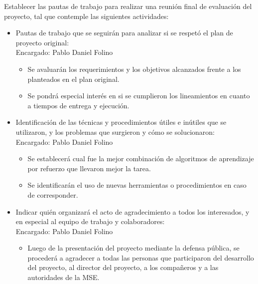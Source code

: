 \documentclass[
11pt, %
codirector, %
]{charter}
\begin{document}
Establecer las pautas de trabajo para realizar una reunión final de evaluación del proyecto, tal que contemple las siguientes actividades:

\begin{itemize}
\item Pautas de trabajo que se seguirán para analizar si se respetó
el plan de proyecto original:\\
Encargado: Pablo Daniel Folino
	\begin{itemize}
	\item Se avaluarán los requerimientos y los objetivos alcanzados frente a los planteados en el plan original.
	\item Se pondrá especial interés en si se cumplieron los lineamientos en cuanto a tiempos de entrega y ejecución.
	\end{itemize}	
\item Identificación de las técnicas y procedimientos útiles e inútiles que se utilizaron, y los problemas que surgieron y cómo se solucionaron:\\
Encargado: Pablo Daniel Folino
	\begin{itemize}
	\item Se establecerá cual fue la mejor combinación de algoritmos de aprendizaje por refuerzo que llevaron mejor la tarea.
	\item Se identificarán el uso de nuevas herramientas o procedimientos en caso de corresponder.
	\end{itemize}
\item Indicar quién organizará el acto de agradecimiento a todos los interesados, y en especial al equipo de trabajo y colaboradores:\\
Encargado: Pablo Daniel Folino
	\begin{itemize}
	\item Luego de la presentación del proyecto mediante la defensa
	pública, se procederá a agradecer a todas las personas que participaron del desarrollo del proyecto, al director del proyecto, a los compañeros y a las autoridades de la MSE.
	\end{itemize}
\end{itemize}

\end{document}
